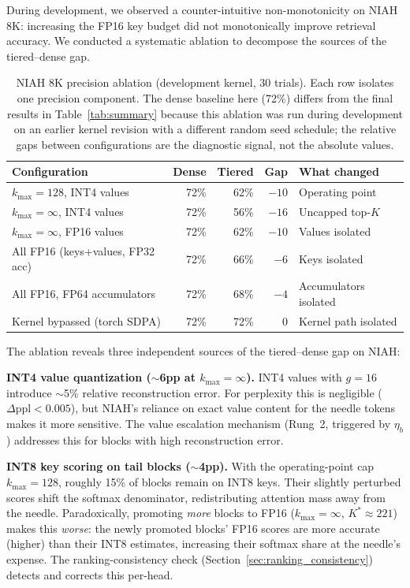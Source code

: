 \documentclass[10pt,twocolumn,a4paper]{article}
\theoremstyle{definition}
\theoremstyle{remark}
\begin{document}
During development, we observed a counter-intuitive non-monotonicity on NIAH 8K: increasing the FP16 key budget did not monotonically improve retrieval accuracy.  We conducted a systematic ablation to decompose the sources of the tiered--dense gap.

\begin{table}[!t]
\centering
\caption{NIAH 8K precision ablation (development kernel, 30 trials).  Each row isolates one precision component.  The dense baseline here (72\%) differs from the final results in Table~\ref{tab:summary} because this ablation was run during development on an earlier kernel revision with a different random seed schedule; the relative gaps between configurations are the diagnostic signal, not the absolute values.}
\label{tab:niah_ablation}
\small
\begin{tabular}{lrrrl}
\toprule
\textbf{Configuration} & \textbf{Dense} & \textbf{Tiered} & \textbf{Gap} & \textbf{What changed} \\
\midrule
$k_{\max}{=}128$, INT4 values & 72\% & 62\% & $-10$ & Operating point \\
$k_{\max}{=}\infty$, INT4 values & 72\% & 56\% & $-16$ & Uncapped top-$K$ \\
$k_{\max}{=}\infty$, FP16 values & 72\% & 62\% & $-10$ & Values isolated \\
All FP16 (keys+values, FP32 acc) & 72\% & 66\% & $-6$ & Keys isolated \\
All FP16, FP64 accumulators & 72\% & 68\% & $-4$ & Accumulators isolated \\
Kernel bypassed (torch SDPA) & 72\% & 72\% & $0$ & Kernel path isolated \\
\bottomrule
\end{tabular}
\end{table}

The ablation reveals three independent sources of the tiered--dense gap on NIAH:

\textbf{INT4 value quantization ($\sim$6pp at $k_{\max}{=}\infty$).}  INT4 values with $g{=}16$ introduce $\sim$5\% relative reconstruction error.  For perplexity this is negligible ($\Delta\mathrm{ppl} < 0.005$), but NIAH's reliance on exact value content for the needle tokens makes it more sensitive.  The value escalation mechanism (Rung~2, triggered by $\eta_b$) addresses this for blocks with high reconstruction error.

\textbf{INT8 key scoring on tail blocks ($\sim$4pp).}  With the operating-point cap $k_{\max}{=}128$, roughly 15\% of blocks remain on INT8 keys.  Their slightly perturbed scores shift the softmax denominator, redistributing attention mass away from the needle.  Paradoxically, promoting \emph{more} blocks to FP16 ($k_{\max}{=}\infty$, $K^*{\approx}221$) makes this \emph{worse}: the newly promoted blocks' FP16 scores are more accurate (higher) than their INT8 estimates, increasing their softmax share at the needle's expense.  The ranking-consistency check (Section~\ref{sec:ranking_consistency}) detects and corrects this per-head.
\end{document}
